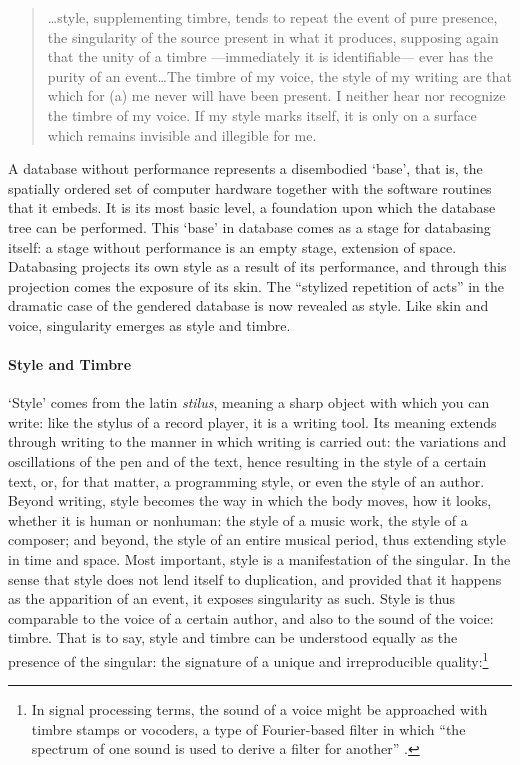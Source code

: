 \begin{quote}
	\dots style, supplementing timbre, tends to repeat the event of pure presence, the singularity of the source present in what it produces, supposing again that the unity of a timbre ---immediately it is identifiable--- ever has the purity of an event\dots The timbre of my voice, the style of my writing are that which for (a) me never will have been present. I neither hear nor recognize the timbre of my voice. If my style marks itself, it is only on a surface which remains invisible and illegible for me. \parencite[296]{Der82:Mar}

\end{quote}

A database without performance represents a disembodied `base', that is, the spatially ordered set of computer hardware together with the software routines that it embeds. It is its most basic level, a foundation upon which the database tree can be performed. This `base' in database comes as a stage for databasing itself: a stage without performance is an empty stage, extension of space. Databasing projects its own style as a result of its performance, and through this projection comes the exposure of its skin. The ``stylized repetition of acts''  \parencite[519]{But88:Per} in the dramatic case of the gendered database is now revealed as style. Like skin and voice, singularity emerges as style and timbre.

\paragraph{Style and Timbre}
`Style' comes from the latin \textit{stilus}, meaning a sharp object with which you can write: like the stylus of a record player, it is a writing tool. Its meaning extends through writing to the manner in which writing is carried out: the variations and oscillations of the pen and of the text, hence resulting in the style of a certain text, or, for that matter, a programming style, or even the style of an author. Beyond writing, style becomes the way in which the body moves, how it looks, whether it is human or nonhuman: the style of a music work, the style of a composer; and beyond, the style of an entire musical period, thus extending style in time and space. Most important, style is a manifestation of the singular. In the sense that style does not lend itself to duplication, and provided that it happens as the apparition of an event, it exposes singularity as such. Style is thus comparable to the voice of a certain author, and also to the sound of the voice: timbre. That is to say, style and timbre can be understood equally as the presence of the singular: the signature of a unique and irreproducible quality:\footnote{In signal processing terms, the sound of a voice might be approached with timbre stamps or vocoders, a type of Fourier-based filter in which ``the spectrum of one sound is used to derive a filter for another'' \parencite{DBLP:conf/icmc/Puckette07}.} 


